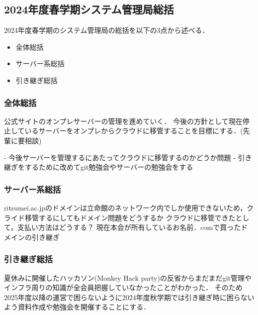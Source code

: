 \subsection*{2024年度春学期システム管理局総括}


2024年度春学期のシステム管理局の総括を以下の3点から述べる．
\begin{itemize}
    \item 全体総括
    \item サーバー系総括
    \item 引き継ぎ総括
\end{itemize}

\subsubsection*{全体総括}
公式サイトのオンプレサーバーの管理を進めていく．
今後の方針として現在停止しているサーバーをオンプレからクラウドに移管することを目標にする．(先輩に要相談)

- 今後サーバーを管理するにあたってクラウドに移管するのかどうか問題
- 引き継ぎをするために改めてgit勉強会やサーバーの勉強会をする

\subsubsection*{サーバー系総括}
ritsumei.ac.jpのドメインは立命館のネットワーク内でしか使用できないため，クライド移管するにしてもドメイン問題をどうするか
クラウドに移管できたとして，支払い方法はどうする？
現在本会が所有しているお名前．comで買ったドメインの引き継ぎ

\subsubsection*{引き継ぎ総括}
夏休みに開催したハッカソン(Monkey Hack party)の反省からまだまだgit管理やインフラ周りの知識が全会員把握していなかったことがわかった．
そのため2025年度以降の運営で困らないように2024年度秋学期では引き継ぎ時に困らないよう資料作成や勉強会を開催することにする．
